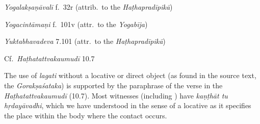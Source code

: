 \begin{ekdosis}
\begin{testimonia}[hp02_051]
\emph{Yogalakṣaṇāvalī} f.~32r (attrib.~to the \emph{Haṭhapradīpikā})
\begin{versinnote}
\end{versinnote}

\emph{Yogacintāmaṇi} f.~101v (attr.~to the \emph{Yogabīja})

\begin{versinnote}
\end{versinnote}

\emph{Yuktabhavadeva} 7.101 (attr.~to the \emph{Haṭhapradīpikā})

\begin{versinnote} 
\end{versinnote}

Cf.~\emph{Haṭhatattvakaumudī} 10.7
\begin{versinnote}
\end{versinnote}
\end{testimonia}

\begin{philcomm}[hp02_051]
The use of \emph{lagati} without a locative or direct object (as found in the source text, the \emph{Gorakṣaśataka}) is supported by the paraphrase of the verse in the \emph{Haṭhatattvakaumudī} (10.7). Most witnesses (including \textalpha) have \emph{kaṇṭhāt tu hṛdayāvadhi}, which we have understood in the sense of a locative as it specifies the place within the body where the contact occurs. 
\end{philcomm}


\end{ekdosis}
